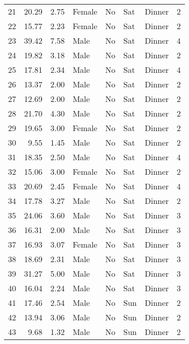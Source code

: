 \begin{tabular}{lrrllllr}
21  &       20.29 &   2.75 &  Female &     No &   Sat &  Dinner &     2 \\
22  &       15.77 &   2.23 &  Female &     No &   Sat &  Dinner &     2 \\
23  &       39.42 &   7.58 &    Male &     No &   Sat &  Dinner &     4 \\
24  &       19.82 &   3.18 &    Male &     No &   Sat &  Dinner &     2 \\
25  &       17.81 &   2.34 &    Male &     No &   Sat &  Dinner &     4 \\
26  &       13.37 &   2.00 &    Male &     No &   Sat &  Dinner &     2 \\
27  &       12.69 &   2.00 &    Male &     No &   Sat &  Dinner &     2 \\
28  &       21.70 &   4.30 &    Male &     No &   Sat &  Dinner &     2 \\
29  &       19.65 &   3.00 &  Female &     No &   Sat &  Dinner &     2 \\
30  &        9.55 &   1.45 &    Male &     No &   Sat &  Dinner &     2 \\
31  &       18.35 &   2.50 &    Male &     No &   Sat &  Dinner &     4 \\
32  &       15.06 &   3.00 &  Female &     No &   Sat &  Dinner &     2 \\
33  &       20.69 &   2.45 &  Female &     No &   Sat &  Dinner &     4 \\
34  &       17.78 &   3.27 &    Male &     No &   Sat &  Dinner &     2 \\
35  &       24.06 &   3.60 &    Male &     No &   Sat &  Dinner &     3 \\
36  &       16.31 &   2.00 &    Male &     No &   Sat &  Dinner &     3 \\
37  &       16.93 &   3.07 &  Female &     No &   Sat &  Dinner &     3 \\
38  &       18.69 &   2.31 &    Male &     No &   Sat &  Dinner &     3 \\
39  &       31.27 &   5.00 &    Male &     No &   Sat &  Dinner &     3 \\
40  &       16.04 &   2.24 &    Male &     No &   Sat &  Dinner &     3 \\
41  &       17.46 &   2.54 &    Male &     No &   Sun &  Dinner &     2 \\
42  &       13.94 &   3.06 &    Male &     No &   Sun &  Dinner &     2 \\
43  &        9.68 &   1.32 &    Male &     No &   Sun &  Dinner &     2 \\

\end{tabular}
